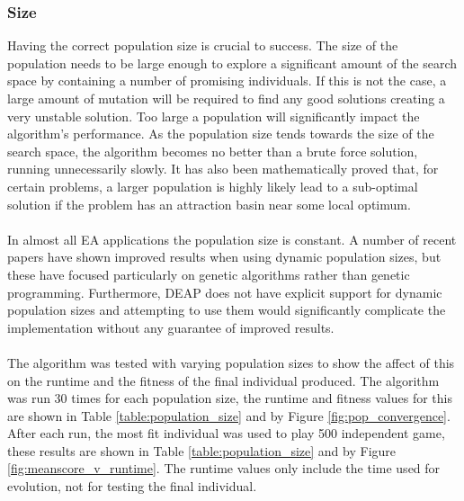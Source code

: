 \documentclass[12pt]{article}
\begin{document}
\subsubsection{Size}
\label{population_size}
Having the correct population size is crucial to success\cite{dynamic_population_size}. The size of the population needs to be large enough to explore a significant amount of the search space by containing a number of promising individuals. If this is not the case, a large amount of mutation will be required to find any good solutions creating a very unstable solution. Too large a population will significantly impact the algorithm's performance. As the population size tends towards the size of the search space, the algorithm becomes no better than a brute force solution, running unnecessarily slowly. It has also been mathematically proved that, for certain problems, a larger population is highly likely lead to a sub-optimal solution if the problem has an attraction basin near some local optimum\cite{unhelpful_large_populations}.
\\\\
In almost all EA applications the population size is constant\cite[p. 20]{textbook}. A number of recent papers have shown improved results when using dynamic population sizes\cite{eiben_dynamicpop, tan_dynamicpop}, but these have focused particularly on genetic algorithms rather than genetic programming. Furthermore, DEAP does not have explicit support for dynamic population sizes and attempting to use them would significantly complicate the implementation without any guarantee of improved results.
\\\\
The algorithm was tested with varying population sizes to show the affect of this on the runtime and the fitness of the final individual produced. The algorithm was run 30 times for each population size, the runtime and fitness values for this are shown in Table \ref{table:population_size} and by Figure \ref{fig:pop_convergence}. After each run, the most fit individual was used to play 500 independent game, these results are shown in Table \ref{table:population_size} and by Figure \ref{fig:meanscore_v_runtime}. The runtime values only include the time used for evolution, not for testing the final individual.
\end{document}
